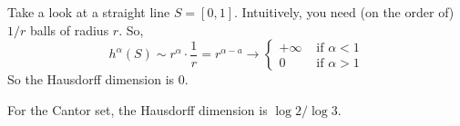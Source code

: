   \begin{example}
    Take a look at a straight line $S = [0, 1]$. Intuitively, you need (on the order of) $1/r$ balls of radius $r$. So, 
    \begin{equation}
      h^\alpha (S) \sim r^\alpha \cdot \frac{1}{r}  = r^{\alpha - a} \to \begin{cases} 
        +\infty & \text{ if } \alpha < 1 \\ 
        0 & \text{ if } \alpha > 1
      \end{cases} 
    \end{equation}
    So the Hausdorff dimension is $0$. 
  \end{example}

  \begin{example}
    For the Cantor set, the Hausdorff dimension is $\log{2}/\log{3}$. 
  \end{example}

